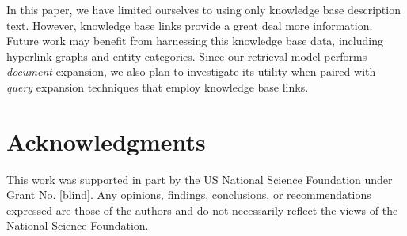 \documentclass{sig-alternate}
\begin{document}
In this paper, we have limited ourselves to using only knowledge base description text. However, knowledge base links provide a great deal more information. Future work may benefit from harnessing this knowledge base data, including hyperlink graphs and entity categories. Since our retrieval model performs \textit{document} expansion, we also plan to investigate its utility when paired with \textit{query} expansion techniques that employ knowledge base links.

\section{Acknowledgments}\label{section.acknowledgments}
This work was supported in part by the US National Science Foundation under Grant No. [blind]. Any opinions, findings, conclusions, or recommendations expressed are those of the authors and do not necessarily reflect the views of the National Science Foundation.



  
\end{document}
